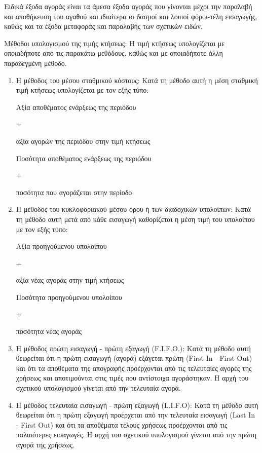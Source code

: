 \documentclass[A4,10pt,greek]{book}
\begin{document}
\begin{enumerate}
Ειδικά έξοδα αγοράς είναι τα άμεσα έξοδα αγοράς που γίνονται μέχρι την παραλαβή και αποθήκευση του αγαθού και ιδιαίτερα οι δασμοί και λοιποί φόροι-τέλη εισαγωγής, καθώς και τα έξοδα μεταφοράς και παραλαβής των σχετικών ειδών.

Μέθοδοι υπολογισμού της τιμής κτήσεως: Η τιμή κτήσεως υπολογίζεται με οποιαδήποτε από τις παρακάτω μεθόδους, καθώς και με οποιαδήποτε άλλη παραδεγμένη μέθοδο.

\begin{enumerate}


\item Η μέθοδος του μέσου σταθμικού κόστους: Κατά τη μέθοδο αυτή η μέση σταθμική τιμή κτήσεως υπολογίζεται με τον εξής τύπο:

Αξία αποθέματος
ενάρξεως της περιόδου
	

+
	

αξία αγορών της περιόδου
στην τιμή κτήσεως


Ποσότητα αποθέματος
ενάρξεως της περιόδου
	

+
	

ποσότητα που αγοράζεται
στην περίοδο

\item Η μέθοδος του κυκλοφοριακού μέσου όρου ή των διαδοχικών υπολοίπων: Κατά τη μέθοδο αυτή μετά από κάθε εισαγωγή καθορίζεται η μέση τιμή του υπολοίπου με τον εξής τύπο:

Αξία προηγούμενου υπολοίπου
	

+
	

αξία νέας αγοράς στην τιμή κτήσεως


Ποσότητα προηγούμενου υπολοίπου
	
+
	
ποσότητα νέας αγοράς

\item Η μέθοδος πρώτη εισαγωγή - πρώτη εξαγωγή (F.I.F.O.): Κατά τη μέθοδο αυτή θεωρείται ότι η πρώτη εισαγωγή (αγορά) εξάγεται πρώτη (First In - First Out) και ότι τα αποθέματα της απογραφής προέρχονται από τις τελευταίες αγορές της χρήσεως και αποτιμούνται στις τιμές που αντίστοιχα αγοράστηκαν. Η αρχή του σχετικού υπολογισμού γίνεται από την τελευταία αγορά.

\item Η μέθοδος τελευταία εισαγωγή - πρώτη εξαγωγή (L.I.F.O): Κατά τη μέθοδο αυτή θεωρείται ότι η πρώτη εξαγωγή προέρχεται από την τελευταία εισαγωγή (Last In - First Out) και ότι τα αποθέματα τέλους χρήσεως προέρχονται από τις παλαιότερες εισαγωγές. Η αρχή του σχετικού υπολογισμού γίνεται από την πρώτη αγορά της χρήσεως.


\end{enumerate}
\end{enumerate}
\end{document}
